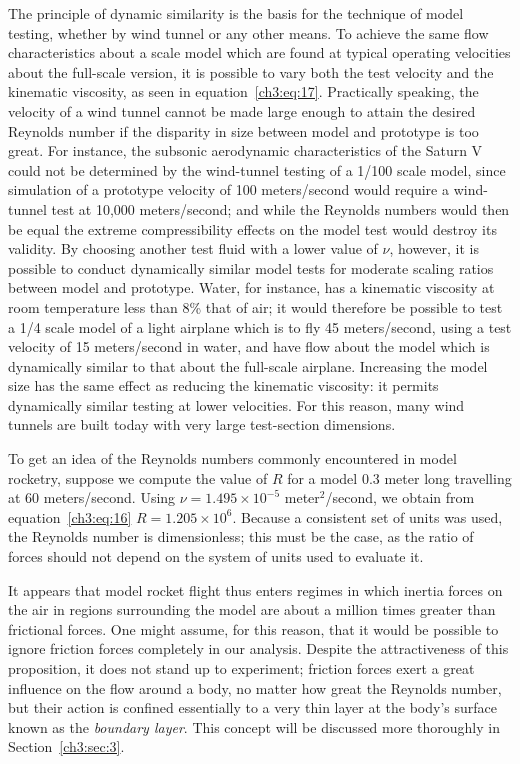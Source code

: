 The principle of dynamic similarity is the basis for the technique of model
testing, whether by wind tunnel or any other means. To achieve the same flow
characteristics about a scale model which are found at typical operating velocities
about the full-scale version, it is possible to vary both the test velocity and the
kinematic viscosity, as seen in equation~\eqref{ch3:eq:17}. Practically speaking,
the velocity of a wind tunnel cannot be made large enough to attain the desired
Reynolds number if the disparity in size between model and prototype is too great.
For instance, the subsonic aerodynamic characteristics of the Saturn V could not be
determined by the wind-tunnel testing of a 1/100 scale model, since simulation of a
prototype velocity of 100 meters/second would require a wind-tunnel test at 10,000
meters/second; and while the Reynolds numbers would then be equal the extreme
compressibility effects on the model test would destroy its validity. By choosing
another test fluid with a lower value of $\nu$, however, it is possible to conduct
dynamically similar model tests for moderate scaling ratios between model and
prototype. Water, for instance, has a kinematic viscosity at room temperature less
than 8\% that of air; it would therefore be possible to test a 1/4 scale model of a
light airplane which is to fly 45 meters/second, using a test velocity of 15
meters/second in water, and have flow about the model which is dynamically similar
to that about the full-scale airplane. Increasing the model size has the same
effect as reducing the kinematic viscosity: it permits dynamically similar testing
at lower velocities. For this reason, many wind tunnels are built today with very
large test-section dimensions.

To get an idea of the Reynolds numbers commonly encountered in model rocketry,
suppose we compute the value of $R$ for a model 0.3 meter long travelling at 60
meters/second. Using $\nu = 1.495 \times 10^{-5}$ meter$^{2}$/second, we obtain from
equation~\eqref{ch3:eq:16} $R = 1.205 \times 10^{6}$. Because a consistent set of
units was used, the Reynolds number is dimensionless; this must be the case, as the
ratio of forces should not depend on the system of units used to evaluate it.

It appears that model rocket flight thus enters regimes in which inertia forces on
the air in regions surrounding the model are about a million times greater than
frictional forces. One might assume, for this reason, that it would be possible to
ignore friction forces completely in our analysis. Despite the attractiveness of
this proposition, it does not stand up to experiment; friction forces exert a great
influence on the flow around a body, no matter how great the Reynolds number, but
their action is confined essentially to a very thin layer at the body's surface
known as the \emph{boundary layer}. This concept will be discussed more thoroughly
in Section~\ref{ch3:sec:3}.

